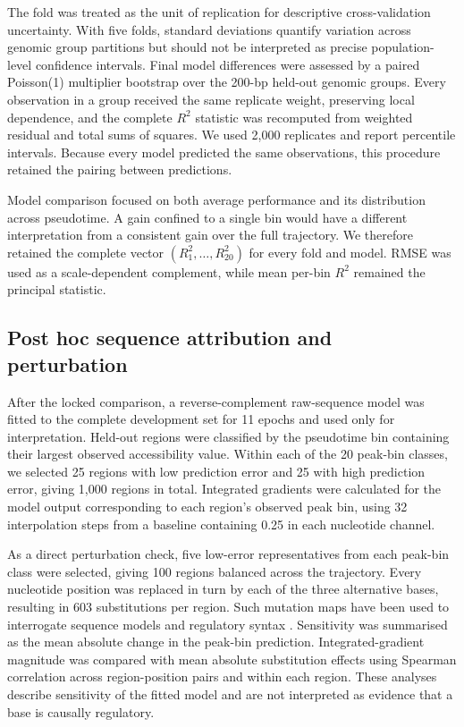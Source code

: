 \documentclass[a4paper,12pt]{article}
\begin{document}
The fold was treated as the unit of replication for descriptive cross-validation uncertainty. With five folds, standard deviations quantify variation across genomic group partitions but should not be interpreted as precise population-level confidence intervals. Final model differences were assessed by a paired Poisson(1) multiplier bootstrap over the 200-bp held-out genomic groups. Every observation in a group received the same replicate weight, preserving local dependence, and the complete $R^2$ statistic was recomputed from weighted residual and total sums of squares. We used 2,000 replicates and report percentile intervals. Because every model predicted the same observations, this procedure retained the pairing between predictions.

Model comparison focused on both average performance and its distribution across pseudotime. A gain confined to a single bin would have a different interpretation from a consistent gain over the full trajectory. We therefore retained the complete vector $(R_1^2,\ldots,R_{20}^2)$ for every fold and model. RMSE was used as a scale-dependent complement, while mean per-bin $R^2$ remained the principal statistic.

\subsection{Post hoc sequence attribution and perturbation}

After the locked comparison, a reverse-complement raw-sequence model was fitted to the complete development set for 11 epochs and used only for interpretation. Held-out regions were classified by the pseudotime bin containing their largest observed accessibility value. Within each of the 20 peak-bin classes, we selected 25 regions with low prediction error and 25 with high prediction error, giving 1,000 regions in total. Integrated gradients \citep{sundararajan2017ig} were calculated for the model output corresponding to each region's observed peak bin, using 32 interpolation steps from a baseline containing 0.25 in each nucleotide channel.

As a direct perturbation check, five low-error representatives from each peak-bin class were selected, giving 100 regions balanced across the trajectory. Every nucleotide position was replaced in turn by each of the three alternative bases, resulting in 603 substitutions per region. Such mutation maps have been used to interrogate sequence models and regulatory syntax \citep{alipanahi2015deepbind,avsec2021bpnet}. Sensitivity was summarised as the mean absolute change in the peak-bin prediction. Integrated-gradient magnitude was compared with mean absolute substitution effects using Spearman correlation across region-position pairs and within each region. These analyses describe sensitivity of the fitted model and are not interpreted as evidence that a base is causally regulatory.
\end{document}
